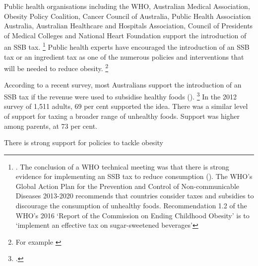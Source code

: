 \documentclass[embargoed]{grattan}
\begin{document}
Public health organisations including the WHO, Australian Medical Association, Obesity Policy Coalition, Cancer Council of Australia, Public Health Association Australia, Australian Healthcare and Hospitals Association, Council of Presidents of Medical Colleges and National Heart Foundation support the introduction of an SSB tax.%
\footnote{\textcites{Coalition2016Policybriefcase}{Health2016Insufficientphysicalactivity}{Health2016Insufficientphysicalactivity}.
The conclusion of a WHO technical meeting was that there is strong evidence for implementing an SSB tax to reduce consumption (\textcite{Organization2016FiscalPoliciesDiet}).
The WHO's Global Action Plan for the Prevention and Control of Non-communicable Diseases 2013-2020 recommends that countries consider taxes and subsidies to discourage the consumption of unhealthy foods.
Recommendation 1.2 of the WHO's 2016 `Report of the Commission on Ending Childhood Obesity' is to `implement an effective tax on sugar-sweetened beverages'} Public health experts have encouraged the introduction of an SSB tax or an ingredient tax as one of the numerous policies and interventions that will be needed to reduce obesity.%
\footnote{For example \textcites{Brownell2009Ouncespreventionthepublic}{Veerman2016ImpactTaxSugar}{Sharma2014effectstaxingsugarsweetened}{NiMhurchu2014Twentypercenttax}{Kaplin2013Usingeconomicpolicy}{Long2015Costeffectivenesssugar}{Cawley2015IncidenceTaxesSugar}}

According to a recent survey, most Australians support the introduction of an SSB tax if the revenue were used to subsidise healthy foods ().%
\footcite{Morley2012Publicopinionfood} In the 2012 survey of 1,511 adults, 69 per cent supported the idea.
There was a similar level of support for taxing a broader range of unhealthy foods.
Support was higher among parents, at 73 per cent. 

\begin{table}
\caption{There is strong support for policies to tackle obesity} \label{tbl:There-is-strong-support-for-policies-to-tackle-obesity}




\end{table}
\end{document}
